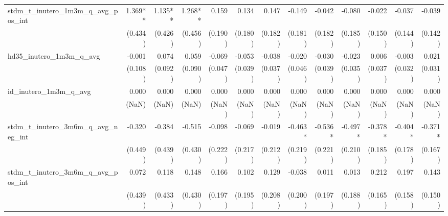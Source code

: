 \begin{tabular}{lrrrrrrrrrrrr}
stdm\_t\_inutero\_1m3m\_q\_avg\_pos\_int    &      1.369** &      1.135** &      1.268** &        0.159 &        0.134 &        0.147 &       -0.149 &       -0.042 &       -0.080 &       -0.022 &       -0.037 &       -0.039 \\ 
                                            &      (0.434) &      (0.426) &      (0.456) &      (0.190) &      (0.180) &      (0.182) &      (0.181) &      (0.182) &      (0.185) &      (0.150) &      (0.144) &      (0.142) \\ 
hd35\_inutero\_1m3m\_q\_avg                 &       -0.001 &        0.074 &        0.059 &       -0.069 &       -0.053 &       -0.038 &       -0.020 &       -0.030 &       -0.023 &        0.006 &       -0.003 &        0.021 \\ 
                                            &      (0.108) &      (0.092) &      (0.090) &      (0.047) &      (0.039) &      (0.037) &      (0.046) &      (0.039) &      (0.035) &      (0.037) &      (0.032) &      (0.031) \\ 
id\_inutero\_1m3m\_q\_avg                   &        0.000 &        0.000 &        0.000 &        0.000 &        0.000 &        0.000 &        0.000 &        0.000 &        0.000 &        0.000 &        0.000 &        0.000 \\ 
                                            &        (NaN) &        (NaN) &        (NaN) &        (NaN) &        (NaN) &        (NaN) &        (NaN) &        (NaN) &        (NaN) &        (NaN) &        (NaN) &        (NaN) \\ 
stdm\_t\_inutero\_3m6m\_q\_avg\_neg\_int    &       -0.320 &       -0.384 &       -0.515 &       -0.098 &       -0.069 &       -0.019 &      -0.463* &      -0.536* &      -0.497* &      -0.378* &      -0.404* &      -0.371* \\ 
                                            &      (0.449) &      (0.439) &      (0.430) &      (0.222) &      (0.217) &      (0.212) &      (0.219) &      (0.221) &      (0.210) &      (0.185) &      (0.178) &      (0.167) \\ 
stdm\_t\_inutero\_3m6m\_q\_avg\_pos\_int    &        0.072 &        0.118 &        0.148 &        0.166 &        0.102 &        0.129 &       -0.038 &        0.011 &        0.013 &        0.212 &        0.197 &        0.143 \\ 
                                            &      (0.439) &      (0.433) &      (0.430) &      (0.197) &      (0.195) &      (0.208) &      (0.200) &      (0.197) &      (0.188) &      (0.165) &      (0.158) &      (0.150) \\ 

\end{tabular}
